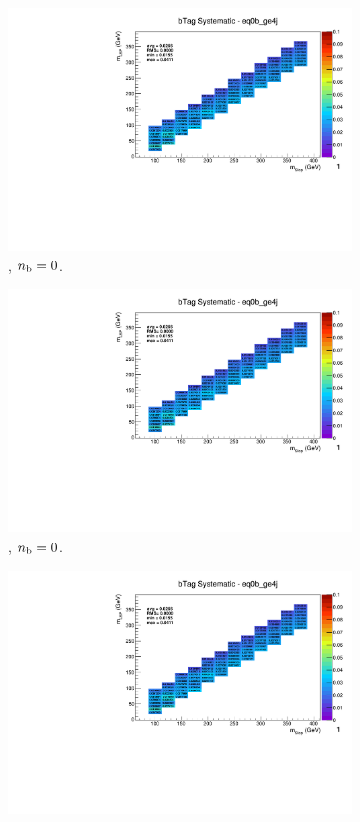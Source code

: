 \begin{figure}[ht!]
\begin{subfigure}[b]{0.32\textwidth}
    \includegraphics[width=\textwidth, page=12]{Figs/sms/t2degen/v19/systs/T2_4body_bTag_eq0b_ge4j.pdf}
    \caption{\njhigh, $n_{\text{b}} = 0$.}
  \end{subfigure}
  \begin{subfigure}[b]{0.32\textwidth}
    \includegraphics[width=\textwidth, page=8]{Figs/sms/t2degen/v19/systs/T2_4body_bTag_eq0b_ge4j.pdf}
    \caption{\njhigh, $n_{\text{b}} = 0$.}
  \end{subfigure}
  \begin{subfigure}[b]{0.32\textwidth}
    \includegraphics[width=\textwidth, page=1]{Figs/sms/t2degen/v19/systs/T2_4body_bTag_eq0b_ge4j.pdf}

\end{subfigure}
\end{figure}
